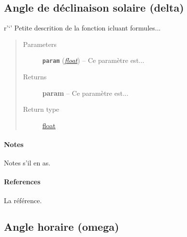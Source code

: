 \documentclass[letterpaper,10pt,english]{sphinxmanual}
\begin{document}
\subsection{Angle de déclinaison solaire (delta)}
\label{python:angle-de-declinaison-solaire-delta}

\begin{fulllineitems}
\label{python:solar_mod.decl_solaire}
r'`' Petite descrition de la fonction icluant formules...
\begin{quote}\begin{description}
\item[{Parameters}] \leavevmode
\textbf{\texttt{param}} (\href{https://docs.python.org/library/functions.html\#float}{\emph{float}}) -- Ce paramètre est...

\item[{Returns}] \leavevmode
\textbf{param} -- Ce paramètre est...

\item[{Return type}] \leavevmode
\href{https://docs.python.org/library/functions.html\#float}{float}

\end{description}\end{quote}
\paragraph{Notes}

Notes s'il en as.
\paragraph{References}

La référence.

\end{fulllineitems}



\subsection{Angle horaire (omega)}
\label{python:angle-horaire-omega}
\end{document}
